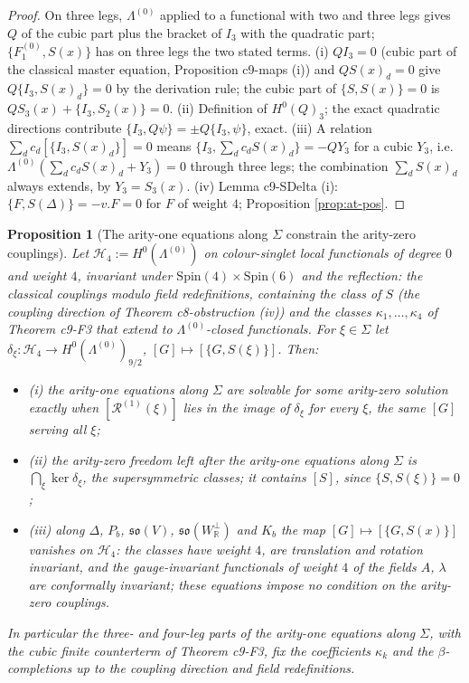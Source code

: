 \documentclass[11pt]{article}
\numberwithin{equation}{section}
\theoremstyle{plain}
\newtheorem{proposition}[theorem]{Proposition}
\theoremstyle{definition}
\begin{document}
\begin{proof}
On three legs, $\Lambda^{(0)}$ applied to a functional with two and three legs gives $Q$ of the cubic part plus the bracket of $I_3$ with the quadratic part; $\{F_1^{(0)},S(x)\}$ has on three legs the two stated terms. (i) $QI_3=0$ (cubic part of the classical master equation, Proposition c9-maps (i)) and $QS(x)_d=0$ give $Q\{I_3,S(x)_d\}=0$ by the derivation rule; the cubic part of $\{S,S(x)\}=0$ is $QS_3(x)+\{I_3,S_2(x)\}=0$. (ii) Definition of $H^0(Q)_3$; the exact quadratic directions contribute $\{I_3,Q\psi\}=\pm Q\{I_3,\psi\}$, exact. (iii) A relation $\sum_dc_d[\{I_3,S(x)_d\}]=0$ means $\{I_3,\sum_dc_dS(x)_d\}=-QY_3$ for a cubic $Y_3$, i.e. $\Lambda^{(0)}(\sum_dc_dS(x)_d+Y_3)=0$ through three legs; the combination $\sum_dS(x)_d$ always extends, by $Y_3=S_3(x)$. (iv) Lemma c9-SDelta (i): $\{F,S(\Delta)\}=-v.F=0$ for $F$ of weight $4$; Proposition \ref{prop:at-pos}.
\end{proof}

\begin{proposition}[The arity-one equations along $\Sigma$ constrain the arity-zero couplings]
\label{prop:at-couplings}
Let $\mathcal H_4:=H^0(\Lambda^{(0)})$ on colour-singlet local functionals of degree $0$ and weight $4$, invariant under $\mathrm{Spin}(4)\times\mathrm{Spin}(6)$ and the reflection: the classical couplings modulo field redefinitions, containing the class of $S$ (the coupling direction of Theorem c8-obstruction (iv)) and the classes $\kappa_1,\dots,\kappa_4$ of Theorem c9-F3 that extend to $\Lambda^{(0)}$-closed functionals. For $\xi\in\Sigma$ let $\delta_\xi:\mathcal H_4\to H^0(\Lambda^{(0)})_{9/2}$, $[G]\mapsto[\{G,S(\xi)\}]$. Then:
\begin{itemize}
\item (i) the arity-one equations along $\Sigma$ are solvable for some arity-zero solution exactly when $[\mathcal R^{(1)}(\xi)]$ lies in the image of $\delta_\xi$ for every $\xi$, the same $[G]$ serving all $\xi$;
\item (ii) the arity-zero freedom left after the arity-one equations along $\Sigma$ is $\bigcap_\xi\ker\delta_\xi$, the supersymmetric classes; it contains $[S]$, since $\{S,S(\xi)\}=0$;
\item (iii) along $\Delta$, $P_b$, $\mathfrak{so}(V)$, $\mathfrak{so}(W^\perp_{\mathbb R})$ and $K_b$ the map $[G]\mapsto[\{G,S(x)\}]$ vanishes on $\mathcal H_4$: the classes have weight $4$, are translation and rotation invariant, and the gauge-invariant functionals of weight $4$ of the fields $A$, $\lambda$ are conformally invariant; these equations impose no condition on the arity-zero couplings.
\end{itemize}
In particular the three- and four-leg parts of the arity-one equations along $\Sigma$, with the cubic finite counterterm of Theorem c9-F3, fix the coefficients $\kappa_k$ and the $\beta$-completions up to the coupling direction and field redefinitions.
\end{proposition}
\end{document}

